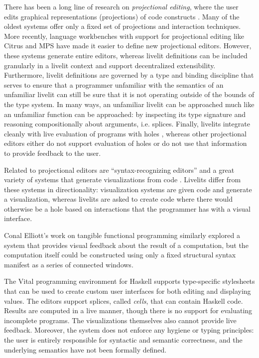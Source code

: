 There has been a long line of research on \emph{projectional editing}, where
the user edits graphical representations (projections) of code constructs \cite{DBLP:journals/ile/MillerPMV94,read1996generating,DBLP:conf/sde/Reiss84,DBLP:conf/uist/KoM05}. 
Many of the oldest systems offer only a fixed set of projections and interaction techniques. 
More recently, language workbenches with support for projectional editing like Citrus \cite{DBLP:conf/uist/KoM05}
and MPS \cite{voelter2011language} have made it easier to define new projectional editors.
However, these systems generate entire editors, whereas livelit definitions can be 
included granularly in a livelit context and support decentralized extensibility.
Furthermore, livelit definitions are governed by a type and binding discipline that 
serves to ensure that a programmer unfamiliar with the semantics of an unfamiliar livelit
can still be sure that it is not operating outside of the bounds of the type system.
In many ways, an unfamiliar livelit can be approached much like an unfamiliar function
can be approached: by inspecting its type signature and reasoning compositionally 
about arguments, i.e. splices.
Finally, livelits integrate cleanly with live evaluation of programs with holes \cite{HazelnutLive},
whereas other projectional editors either do not support evaluation of holes or do 
not use that information to provide feedback to the user.

Related to projectional editors are ``syntax-recognizing editors'' \cite{DBLP:journals/tosem/BallanceGV92,DBLP:conf/sde/HorganM84} and 
a great variety of systems that generate visualizations from code \cite{DBLP:conf/chi/Lerner20,koschke2003software,urquiza2004survey}. Livelits differ 
from these systems in directionality: visualization systems are given code and generate
a visualization, whereas livelits are asked to create code where there would otherwise
be a hole based on interactions that the programmer has with a visual interface.

Conal Elliott's work on tangible functional programming \cite{DBLP:conf/icfp/Elliott07} similarly explored a
system that provides visual feedback about the result of a computation, 
but the computation itself could be constructed using only a fixed structural syntax
manifest as a series of connected windows.

The Vital programming environment for Haskell \cite{hanna2002interactive} supports type-specific stylesheets
that can be used to create custom user interfaces for both editing and displaying
values. The editors support splices, called \emph{cells}, that can contain 
Haskell code. Results are computed in a live manner, though there is no support
for evaluating incomplete programs. The visualizations themselves also cannot provide
live feedback. Moreover, the system does not enforce any hygiene or typing principles:
the user is entirely responsible for syntactic and semantic correctness, and the 
underlying semantics have not been formally defined.



